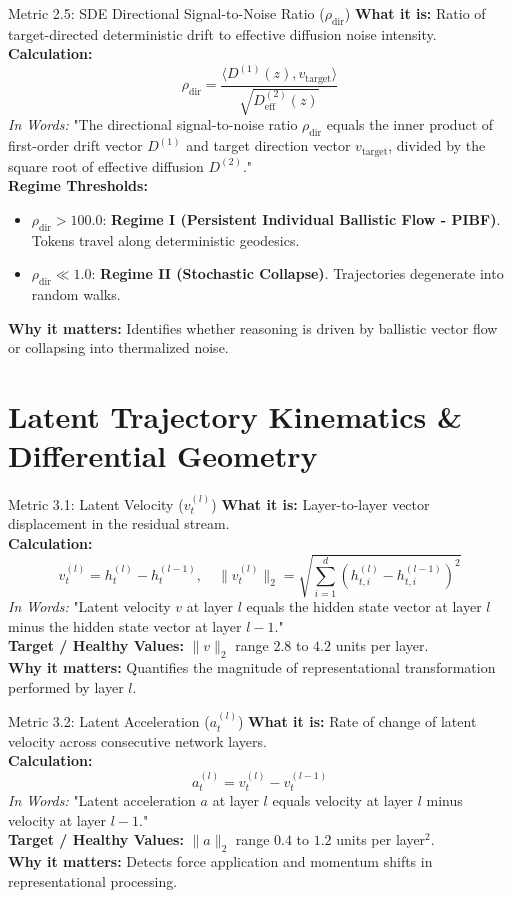 \documentclass[10pt,a4paper]{article}
\begin{document}
\begin{metricbox}{Metric 2.5: SDE Directional Signal-to-Noise Ratio ($\rho_{\text{dir}}$)}
\textbf{What it is:} Ratio of target-directed deterministic drift to effective diffusion noise intensity.\\
\textbf{Calculation:}
$$\rho_{\text{dir}} = \frac{\langle D^{(1)}(z), v_{\text{target}} \rangle}{\sqrt{D^{(2)}_{\text{eff}}(z)}}$$
\emph{In Words:} "The directional signal-to-noise ratio $\rho_{\text{dir}}$ equals the inner product of first-order drift vector $D^{(1)}$ and target direction vector $v_{\text{target}}$, divided by the square root of effective diffusion $D^{(2)}$."\\
\textbf{Regime Thresholds:}
\begin{itemize}
    \item $\rho_{\text{dir}} > 100.0$: \textbf{Regime I (Persistent Individual Ballistic Flow - PIBF)}. Tokens travel along deterministic geodesics.
    \item $\rho_{\text{dir}} \ll 1.0$: \textbf{Regime II (Stochastic Collapse)}. Trajectories degenerate into random walks.
\end{itemize}
\textbf{Why it matters:} Identifies whether reasoning is driven by ballistic vector flow or collapsing into thermalized noise.
\end{metricbox}

\section{Latent Trajectory Kinematics \& Differential Geometry}

\begin{metricbox}{Metric 3.1: Latent Velocity ($v^{(l)}_t$)}
\textbf{What it is:} Layer-to-layer vector displacement in the residual stream.\\
\textbf{Calculation:}
$$v^{(l)}_t = h^{(l)}_t - h^{(l-1)}_t, \quad \|v^{(l)}_t\|_2 = \sqrt{\sum_{i=1}^d \left(h_{t,i}^{(l)} - h_{t,i}^{(l-1)}\right)^2}$$
\emph{In Words:} "Latent velocity $v$ at layer $l$ equals the hidden state vector at layer $l$ minus the hidden state vector at layer $l-1$."\\
\textbf{Target / Healthy Values:} $\|v\|_2$ range $2.8$ to $4.2$ units per layer.\\
\textbf{Why it matters:} Quantifies the magnitude of representational transformation performed by layer $l$.
\end{metricbox}

\begin{metricbox}{Metric 3.2: Latent Acceleration ($a^{(l)}_t$)}
\textbf{What it is:} Rate of change of latent velocity across consecutive network layers.\\
\textbf{Calculation:}
$$a^{(l)}_t = v^{(l)}_t - v^{(l-1)}_t$$
\emph{In Words:} "Latent acceleration $a$ at layer $l$ equals velocity at layer $l$ minus velocity at layer $l-1$."\\
\textbf{Target / Healthy Values:} $\|a\|_2$ range $0.4$ to $1.2$ units per layer$^2$.\\
\textbf{Why it matters:} Detects force application and momentum shifts in representational processing.
\end{metricbox}
\end{document}
